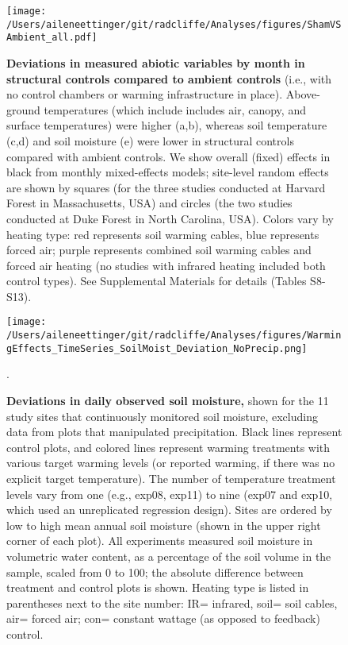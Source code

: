 \documentclass{article}
\begin{document}
 \begin{figure}[p]
\centering
\texttt{[image: /Users/aileneettinger/git/radcliffe/Analyses/figures/ShamVSAmbient\_all.pdf]} 
 \caption{\textbf{Deviations in measured abiotic variables by month in structural controls compared to ambient controls} (i.e., with no control chambers or warming infrastructure in place). Above-ground temperatures (which include includes air, canopy, and surface temperatures) were higher (a,b), whereas soil temperature (c,d) and soil moisture (e) were lower in structural controls compared with ambient controls. We show overall (fixed) effects in black from monthly mixed-effects models; site-level random effects are shown by squares (for the three studies conducted at Harvard Forest in Massachusetts, USA) and circles (the two studies conducted at Duke Forest in North Carolina, USA). Colors vary by heating type: red represents soil warming cables, blue represents forced air; purple represents combined soil warming cables and forced air heating (no studies with infrared heating included both control types). See Supplemental Materials for details (Tables S8-S13). }
 \label{fig:shamamb}
 \end{figure}
\clearpage
 \begin{figure}[h]
 \centering
 \texttt{[image: /Users/aileneettinger/git/radcliffe/Analyses/figures/WarmingEffects\_TimeSeries\_SoilMoist\_Deviation\_NoPrecip.png]} 
 \caption{\textbf{Deviations in daily observed soil moisture,} shown for the 11 study sites that continuously monitored soil moisture, excluding data from plots that manipulated precipitation. Black lines represent control plots, and colored lines represent warming treatments with various target warming levels (or reported warming, if there was no explicit target temperature). The number of temperature treatment levels vary from one (e.g., exp08, exp11) to nine (exp07 and exp10, which used an unreplicated regression design). Sites are ordered by low to high mean annual soil moisture (shown in the upper right corner of each plot). All experiments measured soil moisture in volumetric water content, as a percentage of the soil volume in the sample, scaled from 0 to 100; the absolute difference between treatment and control plots is shown. Heating type is listed in parentheses next to the site number: IR= infrared, soil= soil cables, air= forced air; con= constant wattage (as opposed to feedback) control.}. 
 \label{fig:mois}
 \end{figure}
 
\end{document}
